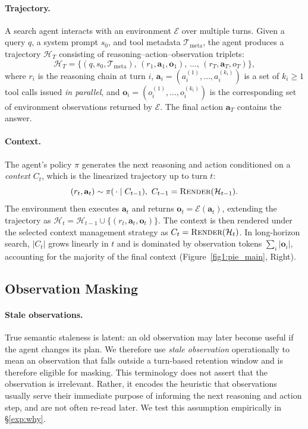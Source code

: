 \paragraph{Trajectory.}
A search agent interacts with an environment $\mathcal{E}$ over multiple turns. Given a query $q$, a system prompt $s_0$, and tool metadata $\mathcal{T}_{\text{meta}}$, the agent produces a trajectory $\mathcal{H}_T$ consisting of reasoning--action--observation triplets:
%
\begin{equation}
\label{eq:trajectory}
\mathcal{H}_T = \big\{(q, s_0, \mathcal{T}_{\text{meta}}),\, (r_1, \mathbf{a}_1, \mathbf{o}_1),\, \ldots,\, (r_T, \mathbf{a}_T, o_{T})\big\},
\end{equation}
%
where $r_i$ is the reasoning chain at turn $i$, $\mathbf{a}_i = (a_i^{(1)}, \ldots, a_i^{(k_i)})$ is a set of $k_i \geq 1$ tool calls issued \emph{in parallel}, and $\mathbf{o}_i = (o_i^{(1)}, \ldots, o_i^{(k_i)})$ is the corresponding set of environment observations returned by $\mathcal{E}$. The final action $\mathbf{a}_T$ contains the answer.

\paragraph{Context.}
The agent's policy $\pi$ generates the next reasoning and action conditioned on a \emph{context} $C_t$, which is the linearized trajectory up to turn $t$:
%
\begin{equation}
\label{eq:policy}
(r_t, \mathbf{a}_t) \sim \pi(\,\cdot \mid C_{t-1}),
\ 
C_{t-1} = \textsc{Render}(\mathcal{H}_{t-1}).
\end{equation}
%
The environment then executes $\mathbf{a}_t$ and returns $\mathbf{o}_t = \mathcal{E}(\mathbf{a}_t)$, extending the trajectory as $\mathcal{H}_t = \mathcal{H}_{t-1} \cup \{(r_t, \mathbf{a}_t, \mathbf{o}_t)\}$. The context is then rendered under the selected context management strategy as $C_t = \textsc{Render}(\mathcal{H}_t)$. In long-horizon search, $|C_t|$ grows linearly in $t$ and is dominated by observation tokens $\sum_i |\mathbf{o}_i|$, accounting for the majority of the final context (Figure~\ref{fig1:pie_main}, Right).


\subsection{Observation Masking}
\label{sec:masking}

\paragraph{Stale observations.}
True semantic staleness is latent: an old observation may later become useful if the agent changes its plan.
We therefore use \emph{stale observation} operationally to mean an observation that falls outside a turn-based retention window and is therefore eligible for masking.
This terminology does not assert that the observation is irrelevant.
Rather, it encodes the heuristic that observations usually serve their immediate purpose of informing the next reasoning and action step, and are not often re-read later.
We test this assumption empirically in \S\ref{exp:why}.

